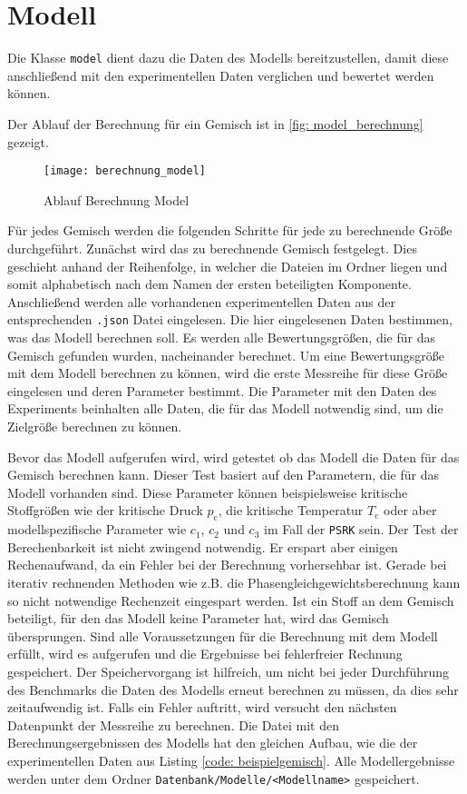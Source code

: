 \documentclass[../thesis.tex]{subfiles}
\begin{document}
\section{Modell}

Die Klasse \texttt{model} dient dazu die Daten des Modells bereitzustellen, damit diese anschließend mit den experimentellen Daten verglichen und bewertet werden können.

Der Ablauf der Berechnung für ein Gemisch ist in \autoref{fig: model_berechnung} gezeigt.

\begin{figure}[htb]
	\centering
	\texttt{[image: berechnung\_model]}
	\caption{Ablauf Berechnung Model}
	\label{fig: model_berechnung}
\end{figure}

Für jedes Gemisch werden die folgenden Schritte für jede zu berechnende Größe durchgeführt. Zunächst wird das zu berechnende Gemisch festgelegt. Dies geschieht anhand der Reihenfolge, in welcher die Dateien im Ordner liegen und somit alphabetisch nach dem Namen der ersten beteiligten Komponente. Anschließend werden alle vorhandenen experimentellen Daten aus der entsprechenden \texttt{.json} Datei eingelesen. Die hier eingelesenen Daten bestimmen, was das Modell berechnen soll. Es werden alle Bewertungsgrößen, die für das Gemisch gefunden wurden, nacheinander berechnet. Um eine Bewertungsgröße mit dem Modell berechnen zu können, wird die erste Messreihe für diese Größe eingelesen und deren Parameter bestimmt. Die Parameter mit den Daten des Experiments beinhalten alle Daten, die für das Modell notwendig sind, um die Zielgröße berechnen zu können.

Bevor das Modell aufgerufen wird, wird getestet ob das Modell die Daten für das Gemisch berechnen kann. Dieser Test basiert auf den Parametern, die für das Modell vorhanden sind. Diese Parameter können beispielsweise kritische Stoffgrößen wie der kritische Druck $p_\mathrm{c}$, die kritische Temperatur $T_\mathrm{c}$ oder aber modellspezifische Parameter wie $c_1$, $c_2$ und $c_3$ im Fall der \texttt{PSRK} sein. Der Test der Berechenbarkeit ist nicht zwingend notwendig. Er erspart aber einigen Rechenaufwand, da ein Fehler bei der Berechnung vorhersehbar ist. Gerade bei iterativ rechnenden Methoden wie z.B. die Phasengleichgewichtsberechnung kann so nicht notwendige Rechenzeit eingespart werden. Ist ein Stoff an dem Gemisch beteiligt, für den das Modell keine Parameter hat, wird das Gemisch übersprungen.
Sind alle Voraussetzungen für die Berechnung mit dem Modell erfüllt, wird es aufgerufen und die Ergebnisse bei fehlerfreier Rechnung gespeichert. Der Speichervorgang ist hilfreich, um nicht bei jeder Durchführung des Benchmarks die Daten des Modells erneut berechnen zu müssen, da dies sehr zeitaufwendig ist. Falls ein Fehler auftritt, wird versucht den nächsten Datenpunkt der Messreihe zu berechnen. Die Datei mit den Berechnungsergebnissen des Modells hat den gleichen Aufbau, wie die der experimentellen Daten aus Listing \autoref{code: beispielgemisch}. Alle Modellergebnisse werden unter dem Ordner \texttt{Datenbank/Modelle/<Modellname>} gespeichert.
\end{document}
